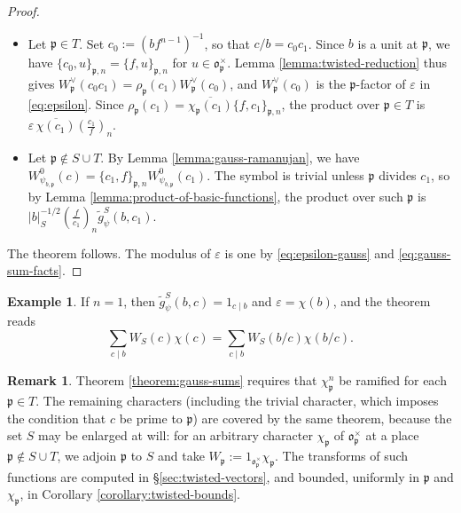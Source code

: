 \documentclass[reqno]{amsart}
\newcommand{\qr}[2]{\left( \frac{#1}{#2} \right)}
\theoremstyle{plain}
\theoremstyle{definition}
\newtheorem{example}[theorem]{Example}
\newtheorem{remark}[theorem]{Remark}
\theoremstyle{itplain}
\numberwithin{equation}{section}
\numberwithin{theorem}{section}
\begin{document}
\begin{proof}
  \begin{itemize}
  \item Let $\mathfrak{p} \in T$.  Set $c_0 := (b f^{n-1})^{-1}$, so that $c / b = c_0 c_1$.  Since $b$ is a unit at $\mathfrak{p}$, we have $\{c_0, u\}_{\mathfrak{p}, n} = \{f, u\}_{\mathfrak{p}, n}$ for $u \in \mathfrak{o}_{\mathfrak{p}}^\times$.  Lemma \ref{lemma:twisted-reduction} thus gives $W_{\mathfrak{p}}^\vee(c_0 c_1) = \rho_{\mathfrak{p}}(c_1) W_{\mathfrak{p}}^\vee(c_0)$, and $W_{\mathfrak{p}}^\vee(c_0)$ is the $\mathfrak{p}$-factor of $\varepsilon$ in \eqref{eq:epsilon}.  Since $\rho_{\mathfrak{p}}(c_1) = \overline{\chi_{\mathfrak{p}}(c_1)} \{f, c_1\}_{\mathfrak{p},n}$, the product over $\mathfrak{p} \in T$ is $\varepsilon \, \overline{\chi(c_1)} \qr{c_1}{f}_n$.
  \item Let $\mathfrak{p} \notin S \cup T$.  By Lemma \ref{lemma:gauss-ramanujan}, we have $W_{\psi_{b,\mathfrak{p}}}^0(c) = \{c_1, f\}_{\mathfrak{p}, n} W_{\psi_{b,\mathfrak{p}}}^0(c_1)$.  The symbol is trivial unless $\mathfrak{p}$ divides $c_1$, so by Lemma \ref{lemma:product-of-basic-functions}, the product over such $\mathfrak{p}$ is $\lvert b \rvert_S^{-1/2} \qr{f}{c_1}_n \tilde{g}_\psi^S(b, c_1)$.
  \end{itemize}
  The theorem follows.  The modulus of $\varepsilon$ is one by \eqref{eq:epsilon-gauss} and \eqref{eq:gauss-sum-facts}.
\end{proof}

\begin{example}
  If $n = 1$, then $\tilde{g}_\psi^S(b, c) = 1_{c \mid b}$ and $\varepsilon = \chi(b)$, and the theorem reads
  \begin{equation*}
    \sum_{c \mid b} W_S(c) \chi(c) = \sum_{c \mid b} W_S(b/c) \chi(b/c).
  \end{equation*}
\end{example}

\begin{remark}\label{remark:further-conditions}
  Theorem \ref{theorem:gauss-sums} requires that $\chi_{\mathfrak{p}}^n$ be ramified for each $\mathfrak{p} \in T$.  The remaining characters (including the trivial character, which imposes the condition that $c$ be prime to $\mathfrak{p}$) are covered by the same theorem, because the set $S$ may be enlarged at will: for an arbitrary character $\chi_{\mathfrak{p}}$ of $\mathfrak{o}_{\mathfrak{p}}^\times$ at a place $\mathfrak{p} \notin S \cup T$, we adjoin $\mathfrak{p}$ to $S$ and take $W_{\mathfrak{p}} := 1_{\mathfrak{o}_{\mathfrak{p}}^\times} \chi_{\mathfrak{p}}$.  The transforms of such functions are computed in \S\ref{sec:twisted-vectors}, and bounded, uniformly in $\mathfrak{p}$ and $\chi_{\mathfrak{p}}$, in Corollary \ref{corollary:twisted-bounds}.
\end{remark}
\end{document}
